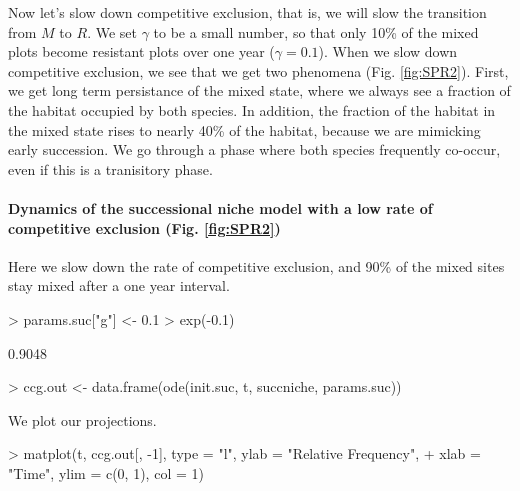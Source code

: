 Now let's slow down competitive exclusion, that is, we will slow the transition from $M$ to $R$. We set  $\gamma$ to be a small number, so that only 10\% of the mixed plots become resistant plots over one year ($\gamma=0.1$). When we slow down competitive exclusion,  we see that we get two phenomena (Fig. \ref{fig:SPR2}). First, we get long term persistance of the mixed state, where we always see a fraction of the habitat occupied by both species. In addition, the fraction of the habitat in the mixed state rises to nearly 40\% of the habitat, because we are mimicking early succession. We go through a phase where both species frequently co-occur, even if this is a tranisitory phase.

\medskip \noindent
\begin{boxedminipage}{\linewidth}
  {\footnotesize
\paragraph{Dynamics of the successional niche model with a low rate of competitive exclusion (Fig. \ref{fig:SPR2})}
Here we slow down the rate of competitive exclusion, and 90\% of the mixed sites stay mixed after a one year interval.
\begin{Schunk}
\begin{Sinput}
> params.suc["g"] <- 0.1
> exp(-0.1)
\end{Sinput}
\begin{Soutput}
[1] 0.9048
\end{Soutput}
\begin{Sinput}
> ccg.out <- data.frame(ode(init.suc, t, succniche, params.suc))
\end{Sinput}
\end{Schunk}
We plot our projections.
\begin{Schunk}
\begin{Sinput}
> matplot(t, ccg.out[, -1], type = "l", ylab = "Relative Frequency", 
+     xlab = "Time", ylim = c(0, 1), col = 1)
\end{Sinput}
\end{Schunk}
}
\end{boxedminipage} \medskip


